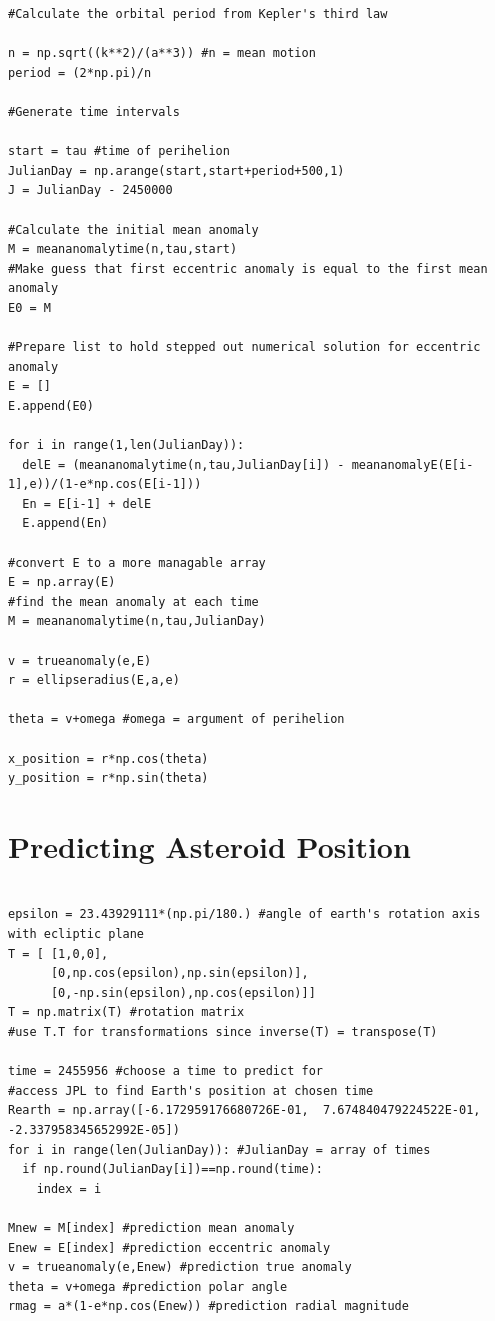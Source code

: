 \documentclass[a4paper,12pt]{article}
\begin{document}
\begin{appendices}
\footnotesize\begin{verbatim}
#Calculate the orbital period from Kepler's third law

n = np.sqrt((k**2)/(a**3)) #n = mean motion
period = (2*np.pi)/n

#Generate time intervals

start = tau #time of perihelion
JulianDay = np.arange(start,start+period+500,1)
J = JulianDay - 2450000

#Calculate the initial mean anomaly
M = meananomalytime(n,tau,start)
#Make guess that first eccentric anomaly is equal to the first mean anomaly
E0 = M

#Prepare list to hold stepped out numerical solution for eccentric anomaly
E = []
E.append(E0)

for i in range(1,len(JulianDay)):
  delE = (meananomalytime(n,tau,JulianDay[i]) - meananomalyE(E[i-1],e))/(1-e*np.cos(E[i-1]))
  En = E[i-1] + delE
  E.append(En)

#convert E to a more managable array
E = np.array(E)
#find the mean anomaly at each time
M = meananomalytime(n,tau,JulianDay)

v = trueanomaly(e,E)
r = ellipseradius(E,a,e)

theta = v+omega #omega = argument of perihelion

x_position = r*np.cos(theta)
y_position = r*np.sin(theta)
\end{verbatim}
\normalsize

\section{Predicting Asteroid Position}
\footnotesize\begin{verbatim}

epsilon = 23.43929111*(np.pi/180.) #angle of earth's rotation axis with ecliptic plane
T = [ [1,0,0],
      [0,np.cos(epsilon),np.sin(epsilon)],
      [0,-np.sin(epsilon),np.cos(epsilon)]]
T = np.matrix(T) #rotation matrix
#use T.T for transformations since inverse(T) = transpose(T)

time = 2455956 #choose a time to predict for
#access JPL to find Earth's position at chosen time
Rearth = np.array([-6.172959176680726E-01,  7.674840479224522E-01, -2.337958345652992E-05])
for i in range(len(JulianDay)): #JulianDay = array of times
  if np.round(JulianDay[i])==np.round(time):
    index = i

Mnew = M[index] #prediction mean anomaly
Enew = E[index] #prediction eccentric anomaly
v = trueanomaly(e,Enew) #prediction true anomaly
theta = v+omega #prediction polar angle
rmag = a*(1-e*np.cos(Enew)) #prediction radial magnitude


\end{verbatim}
\end{appendices}
\end{document}
